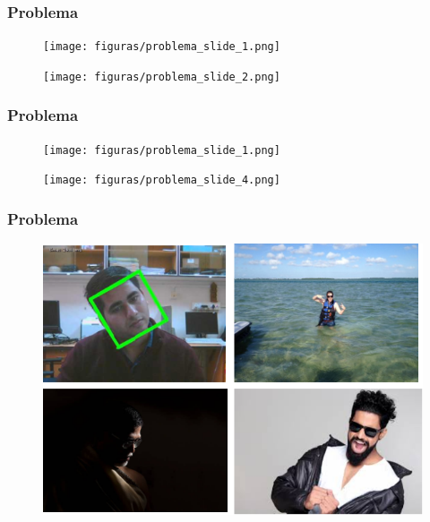\documentclass{beamer}
\begin{document}
\begin{frame}
\frametitle{Problema}

\begin{figure}
\centering
\texttt{[image: figuras/problema\_slide\_1.png]}
\label{fig:problema1}
\end{figure}

\begin{figure}
\centering
\texttt{[image: figuras/problema\_slide\_2.png]}
\label{fig:arquitetura1}
\end{figure}



\end{frame}


\begin{frame}
\frametitle{Problema}

\begin{figure}
\centering
\texttt{[image: figuras/problema\_slide\_1.png]}
\label{fig:problema1}
\end{figure}

\begin{figure}
\centering
\texttt{[image: figuras/problema\_slide\_4.png]}
\label{fig:arquitetura1}
\end{figure}
\end{frame}

\begin{frame}
\frametitle{Problema}
\begin{figure}
\centering
\includegraphics[scale=0.39]{figuras/contexto_5.png}
\label{fig:problema1}
\end{figure}
\end{frame}
\end{document}
